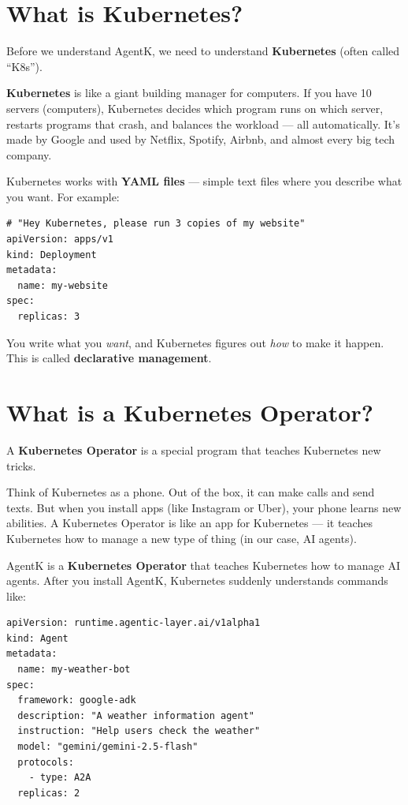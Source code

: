 \documentclass[12pt,a4paper,openany]{report}
\begin{document}
\section{What is Kubernetes?}

Before we understand AgentK, we need to understand \textbf{Kubernetes} (often called ``K8s'').

\begin{keyconceptbox}
\textbf{Kubernetes} is like a giant building manager for computers. If you have 10 servers (computers), Kubernetes decides which program runs on which server, restarts programs that crash, and balances the workload — all automatically. It's made by Google and used by Netflix, Spotify, Airbnb, and almost every big tech company.
\end{keyconceptbox}

Kubernetes works with \textbf{YAML files} — simple text files where you describe what you want. For example:

\begin{lstlisting}[style=yaml, caption={A simple Kubernetes instruction}]
# "Hey Kubernetes, please run 3 copies of my website"
apiVersion: apps/v1
kind: Deployment
metadata:
  name: my-website
spec:
  replicas: 3
\end{lstlisting}

You write what you \textit{want}, and Kubernetes figures out \textit{how} to make it happen. This is called \textbf{declarative management}.

\section{What is a Kubernetes Operator?}

A \textbf{Kubernetes Operator} is a special program that teaches Kubernetes new tricks.

\begin{analogybox}
Think of Kubernetes as a phone. Out of the box, it can make calls and send texts. But when you install apps (like Instagram or Uber), your phone learns new abilities. A Kubernetes Operator is like an app for Kubernetes — it teaches Kubernetes how to manage a new type of thing (in our case, AI agents).
\end{analogybox}

AgentK is a \textbf{Kubernetes Operator} that teaches Kubernetes how to manage AI agents. After you install AgentK, Kubernetes suddenly understands commands like:

\begin{lstlisting}[style=yaml, caption={Creating an AI agent with AgentK}]
apiVersion: runtime.agentic-layer.ai/v1alpha1
kind: Agent
metadata:
  name: my-weather-bot
spec:
  framework: google-adk
  description: "A weather information agent"
  instruction: "Help users check the weather"
  model: "gemini/gemini-2.5-flash"
  protocols:
    - type: A2A
  replicas: 2
\end{lstlisting}
\end{document}
